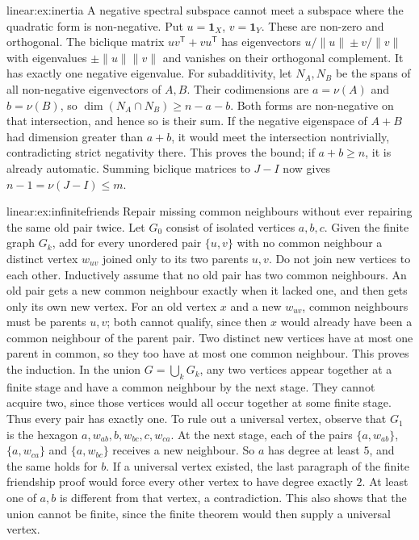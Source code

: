\begin{solution}{linear:ex:inertia}
\idea A negative spectral subspace cannot meet a subspace where the quadratic form is non-negative.
\writeup Put $u=\mathbf1_X$, $v=\mathbf1_Y$. These are non-zero and orthogonal. The biclique matrix $uv^{\mathsf T}+vu^{\mathsf T}$ has eigenvectors $u/\|u\|\pm v/\|v\|$ with eigenvalues $\pm\|u\|\|v\|$ and vanishes on their orthogonal complement. It has exactly one negative eigenvalue.
For subadditivity, let $N_A,N_B$ be the spans of all non-negative eigenvectors of $A,B$. Their codimensions are $a=\nu(A)$ and $b=\nu(B)$, so $\dim(N_A\cap N_B)\ge n-a-b$. Both forms are non-negative on that intersection, and hence so is their sum. If the negative eigenspace of $A+B$ had dimension greater than $a+b$, it would meet the intersection nontrivially, contradicting strict negativity there. This proves the bound; if $a+b\ge n$, it is already automatic. Summing biclique matrices to $J-I$ now gives $n-1=\nu(J-I)\le m$.
\end{solution}

\begin{solution}{linear:ex:infinitefriends}
\idea Repair missing common neighbours without ever repairing the same old pair twice.
\writeup Let $G_0$ consist of isolated vertices $a,b,c$. Given the finite graph $G_k$, add for every unordered pair $\{u,v\}$ with no common neighbour a distinct vertex $w_{uv}$ joined only to its two parents $u,v$. Do not join new vertices to each other. Inductively assume that no old pair has two common neighbours.
An old pair gets a new common neighbour exactly when it lacked one, and then gets only its own new vertex. For an old vertex $x$ and a new $w_{uv}$, common neighbours must be parents $u,v$; both cannot qualify, since then $x$ would already have been a common neighbour of the parent pair. Two distinct new vertices have at most one parent in common, so they too have at most one common neighbour. This proves the induction.
In the union $G=\bigcup_kG_k$, any two vertices appear together at a finite stage and have a common neighbour by the next stage. They cannot acquire two, since those vertices would all occur together at some finite stage. Thus every pair has exactly one.
To rule out a universal vertex, observe that $G_1$ is the hexagon $a,w_{ab},b,w_{bc},c,w_{ca}$. At the next stage, each of the pairs $\{a,w_{ab}\}$, $\{a,w_{ca}\}$ and $\{a,w_{bc}\}$ receives a new neighbour. So $a$ has degree at least $5$, and the same holds for $b$. If a universal vertex existed, the last paragraph of the finite friendship proof would force every other vertex to have degree exactly $2$. At least one of $a,b$ is different from that vertex, a contradiction. This also shows that the union cannot be finite, since the finite theorem would then supply a universal vertex.
\end{solution}

